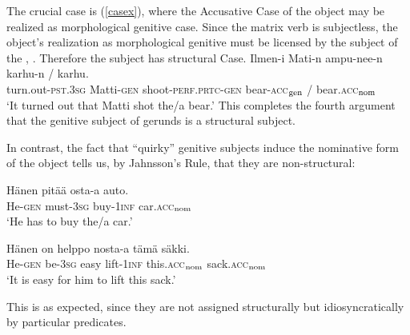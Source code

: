 \documentclass[output=paper,
modfonts
]{LSP/langsci}
\newcommand{\rf}[1]{(\ref{#1})}
\def\trf#1{$_{\textrm{\scriptsize{#1}}}$}
\begin{document}
The crucial case is \rf{casex}, where the  Accusative Case of the object may be
realized as morphological genitive case.  Since the matrix verb is subjectless, the object's
realization as morphological genitive  must be licensed by the subject of the ,
.  Therefore the subject has structural Case.
\ea\label{casex}
  \gll  Ilmen-i Mati-n ampu-nee-n karhu-n / karhu. \\
  turn.out-\textsc{pst}.\textsc{3sg}  Matti-\textsc{gen}  shoot-\textsc{perf}.\textsc{prtc}-\textsc{gen} bear-\textsc{acc\trf{gen}} / bear.\textsc{acc\trf{nom}} \\ 
  \glt `It turned out that Matti shot the/a bear.'
\z
This completes the fourth argument that the genitive subject of gerunds is a structural subject.

In contrast, the fact that ``quirky'' genitive subjects induce the nominative form of the
object tells us, by Jahnsson's Rule, that they are non-structural: 
\begin{exe}
\ex\label{shortobj}
	\ea   \gll Hänen pitää osta-a auto. \\ 
He-\textsc{gen} must-\textsc{3sg} buy-\textsc{1inf} car.\textsc{acc\trf{nom}}  \\ 
\glt `He has to buy the/a car.'

	\ex   \gll Hänen on helppo nosta-a tämä säkki. \\ 
He-\textsc{gen} be-\textsc{3sg} easy lift-\textsc{1inf} this.\textsc{acc\trf{nom}} sack.\textsc{acc\trf{nom}}   \\ 
\glt `It is easy for him to lift this sack.'
	\z
\end{exe}
This is as expected, since they are not assigned structurally but idiosyncratically by
particular predicates.
\end{document}
